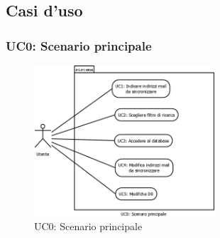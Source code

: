 \subsection{Casi d'uso}

\subsubsection[UC0: Scenario principale]{UC0: Scenario principale}
\begin{figure}[H]
  \begin{center}
\includegraphics[width=0.60\textwidth]{img/UC0_ScenarioPrincipale.png}
\caption{UC0: Scenario principale}
\label{fig:UC0}
\end{center}
\end{figure}

